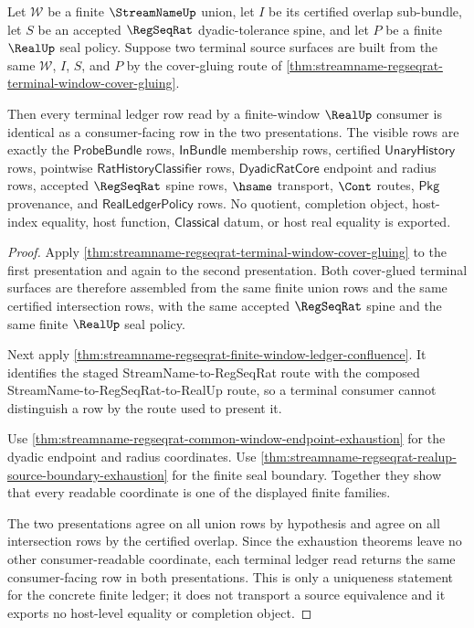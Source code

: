 \begin{theorem}
\label{thm:streamname-regseqrat-cover-glued-ledger-uniqueness}
Let $\mathcal W$ be a finite $\StreamNameUp$ union, let $I$ be its certified
overlap sub-bundle, let $S$ be an accepted $\RegSeqRat$ dyadic-tolerance
spine, and let $P$ be a finite $\RealUp$ seal policy. Suppose two terminal
source surfaces are built from the same $\mathcal W$, $I$, $S$, and $P$ by the
cover-gluing route of
\autoref{thm:streamname-regseqrat-terminal-window-cover-gluing}.

Then every terminal ledger row read by a finite-window $\RealUp$ consumer is
identical as a consumer-facing row in the two presentations. The visible rows
are exactly the $\mathsf{ProbeBundle}$ rows, $\mathsf{InBundle}$ membership
rows, certified $\mathsf{UnaryHistory}$ rows, pointwise
$\mathsf{RatHistoryClassifier}$ rows, $\mathsf{DyadicRatCore}$ endpoint and
radius rows, accepted $\RegSeqRat$ spine rows, $\hsame$ transport,
$\Cont$ routes, $\mathsf{Pkg}$ provenance, and
$\mathsf{RealLedgerPolicy}$ rows. No quotient, completion object, host-index
equality, host function, $\mathsf{Classical}$ datum, or host real equality is
exported.
\end{theorem}
\begin{proof}
Apply
\autoref{thm:streamname-regseqrat-terminal-window-cover-gluing} to the first
presentation and again to the second presentation. Both cover-glued terminal
surfaces are therefore assembled from the same finite union rows and the same
certified intersection rows, with the same accepted $\RegSeqRat$ spine and the
same finite $\RealUp$ seal policy.

Next apply
\autoref{thm:streamname-regseqrat-finite-window-ledger-confluence}. It
identifies the staged StreamName-to-RegSeqRat route with the composed
StreamName-to-RegSeqRat-to-RealUp route, so a terminal consumer cannot
distinguish a row by the route used to present it.

Use \autoref{thm:streamname-regseqrat-common-window-endpoint-exhaustion} for
the dyadic endpoint and radius coordinates. Use
\autoref{thm:streamname-regseqrat-realup-source-boundary-exhaustion} for the
finite seal boundary. Together they show that every readable coordinate is one
of the displayed finite families.

The two presentations agree on all union rows by hypothesis and agree on all
intersection rows by the certified overlap. Since the exhaustion theorems leave
no other consumer-readable coordinate, each terminal ledger read returns the
same consumer-facing row in both presentations. This is only a uniqueness
statement for the concrete finite ledger; it does not transport a source
equivalence and it exports no host-level equality or completion object.
\end{proof}

